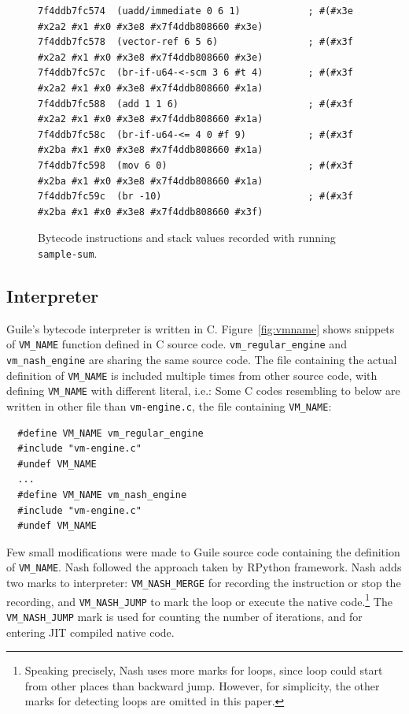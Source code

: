\documentclass[preprint, numbers]{sigplanconf}
\begin{document}
\begin{figure}
  \centering
\begin{verbatim}
7f4ddb7fc574  (uadd/immediate 0 6 1)            ; #(#x3e #x2a2 #x1 #x0 #x3e8 #x7f4ddb808660 #x3e)
7f4ddb7fc578  (vector-ref 6 5 6)                ; #(#x3f #x2a2 #x1 #x0 #x3e8 #x7f4ddb808660 #x3e)
7f4ddb7fc57c  (br-if-u64-<-scm 3 6 #t 4)        ; #(#x3f #x2a2 #x1 #x0 #x3e8 #x7f4ddb808660 #x1a)
7f4ddb7fc588  (add 1 1 6)                       ; #(#x3f #x2a2 #x1 #x0 #x3e8 #x7f4ddb808660 #x1a)
7f4ddb7fc58c  (br-if-u64-<= 4 0 #f 9)           ; #(#x3f #x2ba #x1 #x0 #x3e8 #x7f4ddb808660 #x1a)
7f4ddb7fc598  (mov 6 0)                         ; #(#x3f #x2ba #x1 #x0 #x3e8 #x7f4ddb808660 #x1a)
7f4ddb7fc59c  (br -10)                          ; #(#x3f #x2ba #x1 #x0 #x3e8 #x7f4ddb808660 #x3f)
\end{verbatim}
\caption{Bytecode instructions and stack values recorded with running
  \texttt{sample-sum}.}
\label{fig:trace}
\end{figure}

\subsection{Interpreter}
Guile's bytecode interpreter is written in
C. Figure~\hyperref[fig:vmname]{\ref{fig:vmname}} shows snippets of
\texttt{VM\_NAME} function defined in C source
code. \texttt{vm\_regular\_engine} and \texttt{vm\_nash\_engine} are sharing
the same source code. The file containing the actual definition of
\texttt{VM\_NAME} is included multiple times from other source code, with
defining \texttt{VM\_NAME} with different literal, i.e.: Some C codes
resembling to below are written in other file than \texttt{vm-engine.c}, the
file containing \texttt{VM\_NAME}:

\begin{verbatim}
  #define VM_NAME vm_regular_engine
  #include "vm-engine.c"
  #undef VM_NAME
  ...
  #define VM_NAME vm_nash_engine
  #include "vm-engine.c"
  #undef VM_NAME
\end{verbatim}

Few small modifications were made to Guile source code containing the
definition of \texttt{VM\_NAME}.  Nash followed the approach taken by
RPython\cite{bolz2009tracing} framework.  Nash adds two marks to interpreter:
\texttt{VM\_NASH\_MERGE} for recording the instruction or stop the recording,
and \texttt{VM\_NASH\_JUMP} to mark the loop or execute the native
code.\footnote{ Speaking precisely, Nash uses more marks for loops, since loop
  could start from other places than backward jump. However, for simplicity,
  the other marks for detecting loops are omitted in this paper.} The
\texttt{VM\_NASH\_JUMP} mark is used for counting the number of iterations,
and for entering JIT compiled native code.
\end{document}
